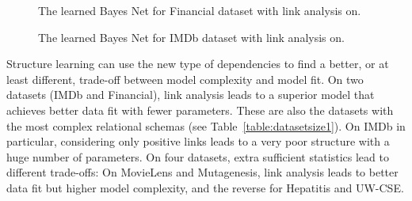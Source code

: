 \documentclass{sfuthesis}
\begin{document}
\begin{figure}[H]	
\begin{center}
\caption{The learned Bayes Net for Financial dataset with link analysis on.\label{fig:finbn}
}
\end{center}
\end{figure}
\begin{figure}[H]
\begin{center}
\caption{The learned Bayes Net for IMDb dataset with link analysis on.\label{fig:imdbbn}
}
\end{center}
\end{figure}


Structure learning can use the new type of dependencies to find a better, or at least different, trade-off between model complexity and model fit.
On two datasets (IMDb and Financial), link analysis leads to a superior model that achieves better data fit with fewer parameters. These are also the datasets with the most complex relational schemas (see Table~\ref{table:datasetsize1}). On IMDb in particular, considering only positive links leads to a very poor structure with a huge number of parameters.
On four datasets, extra sufficient statistics lead to different trade-offs: On MovieLens and Mutagenesis, link analysis leads to better data fit but higher model complexity, and the reverse for Hepatitis and UW-CSE. 
\end{document}
